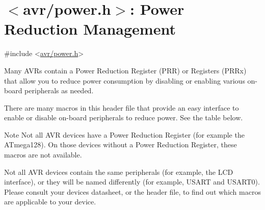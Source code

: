 \hypertarget{group__avr__power}{}\section{$<$avr/power.h$>$\+: Power Reduction Management}
\label{group__avr__power}

\begin{DoxyCode}
\textcolor{preprocessor}{#include <\hyperlink{power_8h}{avr/power.h}>}
\end{DoxyCode}


Many A\+V\+Rs contain a Power Reduction Register (P\+RR) or Registers (P\+R\+Rx) that allow you to reduce power consumption by disabling or enabling various on-\/board peripherals as needed.

There are many macros in this header file that provide an easy interface to enable or disable on-\/board peripherals to reduce power. See the table below.

\begin{DoxyNote}{Note}
Not all A\+VR devices have a Power Reduction Register (for example the A\+Tmega128). On those devices without a Power Reduction Register, these macros are not available.

Not all A\+VR devices contain the same peripherals (for example, the L\+CD interface), or they will be named differently (for example, U\+S\+A\+RT and U\+S\+A\+R\+T0). Please consult your device\textquotesingle{}s datasheet, or the header file, to find out which macros are applicable to your device.
\end{DoxyNote}
\label{group__avr__power_avr_powermacros}%
\hypertarget{group__avr__power_avr_powermacros}{}%

